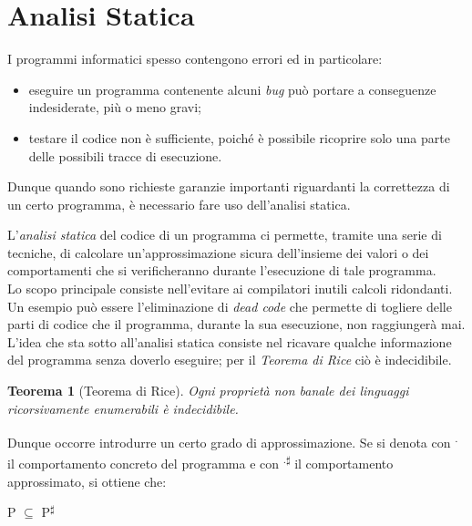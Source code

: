 \documentclass[a4paper, 10pt]{report}
\newtheorem{thm}{Teorema}
\begin{document}
\chapter*{Analisi Statica}
I programmi informatici spesso contengono errori ed in particolare:
\begin{itemize}
	\item eseguire un programma contenente alcuni \textit{bug} può portare a conseguenze indesiderate, più o meno gravi;
	\item testare il codice non è sufficiente, poiché è possibile ricoprire solo una parte delle possibili tracce di esecuzione.
\end{itemize}
 Dunque quando sono richieste garanzie importanti riguardanti la correttezza di un certo programma, è necessario fare uso dell'analisi statica.\\
\medskip

\noindent
L'\textit{analisi statica} del codice di un programma ci permette, tramite una serie di tecniche, di calcolare un'approssimazione sicura dell'insieme dei valori o dei comportamenti che si verificheranno durante l'esecuzione di tale programma.\\
Lo scopo principale consiste nell'evitare ai compilatori inutili calcoli ridondanti. Un esempio può essere l'eliminazione di \textit{dead code} che permette di togliere delle parti di codice che il programma, durante la sua esecuzione, non raggiungerà mai.
\\
L'idea che sta sotto all'analisi statica consiste nel ricavare qualche informazione del programma senza doverlo eseguire; per il \textit{Teorema di Rice} ciò è indecidibile.
\begin{thm}[Teorema di Rice]
	Ogni proprietà non banale dei linguaggi ricorsivamente enumerabili è indecidibile.
\end{thm}
Dunque occorre introdurre un certo grado di approssimazione. Se si denota con \textlbrackdbl \textsuperscript{.}\textrbrackdbl\hspace{0.01cm} il comportamento concreto del programma e con \textlbrackdbl \textsuperscript{.}\textrbrackdbl\textsuperscript{$\sharp$} il comportamento approssimato, si ottiene che:
\begin{center}
	\textlbrackdbl P\textrbrackdbl\hspace{0.01cm} $\subseteq$ \textlbrackdbl P\textrbrackdbl\textsuperscript{$\sharp$}
\end{center}
\end{document}
